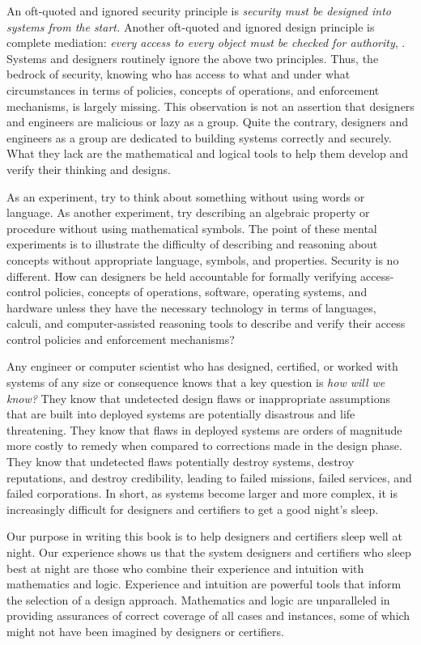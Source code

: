 An oft-quoted and ignored security principle is \emph{security must be
  designed into systems from the start.} Another oft-quoted and
ignored design principle is complete mediation: \emph{every access to
  every object must be checked for authority}, \cite{SS75}. Systems
and designers routinely ignore the above two principles. Thus, the
bedrock of security, knowing who has access to what and under what
circumstances in terms of policies, concepts of operations, and
enforcement mechanisms, is largely missing. This observation is not an
assertion that designers and engineers are malicious or lazy as a
group. Quite the contrary, designers and engineers as a group are
dedicated to building systems correctly and securely. What they lack
are the mathematical and logical tools to help them develop and verify
their thinking and designs.

As an experiment, try to think about something without using words or
language. As another experiment, try describing an algebraic property
or procedure without using mathematical symbols. The point of these
mental experiments is to illustrate the difficulty of describing and
reasoning about concepts without appropriate language, symbols, and
properties.  Security is no different. How can designers be held
accountable for formally verifying access-control policies, concepts
of operations, software, operating systems, and hardware unless they
have the necessary technology in terms of languages, calculi, and
computer-assisted reasoning tools to describe and verify their access
control policies and enforcement mechanisms?

Any engineer or computer scientist who has designed, certified, or
worked with systems of any size or consequence knows that a key
question is \emph{how will we know?}  They know that undetected design
flaws or inappropriate assumptions that are built into deployed
systems are potentially disastrous and life threatening. They know
that flaws in deployed systems are orders of magnitude more costly to
remedy when compared to corrections made in the design phase. They
know that undetected flaws potentially destroy systems, destroy
reputations, and destroy credibility, leading to failed missions,
failed services, and failed corporations.  In short, as systems become
larger and more complex, it is increasingly difficult for designers
and certifiers to get a good night's sleep.

Our purpose in writing this book is to help designers and certifiers
sleep well at night.  Our experience shows us that the system designers
and certifiers who sleep best at night are those who combine their
experience and intuition with mathematics and logic.  Experience and
intuition are powerful tools that inform the selection of a design
approach. Mathematics and logic are unparalleled in providing
assurances of correct coverage of all cases and instances, some of
which might not have been imagined by designers or certifiers.

